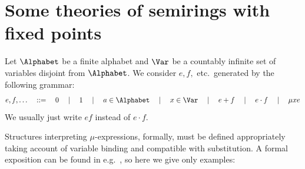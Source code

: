 \setcounter{section}{1}
\section{Some theories of semirings with fixed points}
\label{sec:prelims}

Let $\Alphabet$ be a finite alphabet and $\Var$ be a countably infinite set of variables disjoint from $\Alphabet$. 
We consider  $e,f,$ etc.\ generated by the following grammar:
\[
e,f,\dots \quad ::= \quad
0 \quad \mid \quad 1 \quad \mid \quad a \in \Alphabet \quad \mid \quad x\in\Var \quad \mid \quad e+f \quad \mid \quad e\cdot f \quad \mid \quad \mu x e
\]
We usually just write $ef$ instead of $e\cdot f$.

Structures interpreting $\mu$-expressions, formally, must be defined appropriately taking account of variable binding and compatible with substitution. 
A formal exposition can be found in e.g.\ \cite{EsikLeiss05,Leiss16}, so here we give only examples:

